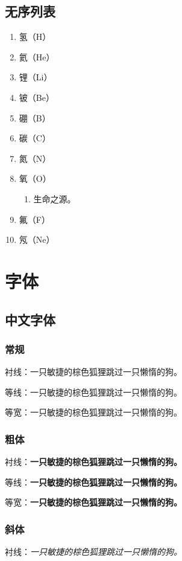 \subsection{无序列表}
\begin{enumerate}
    \item 氢（H）
    \item 氦（He）
    \item 锂（Li）
    \item 铍（Be）
    \item 硼（B）
    \item 碳（C）
    \item 氮（N）
    \item 氧（O）
    \begin{enumerate}
        \item 生命之源。
    \end{enumerate}
    \item 氟（F）
    \item 氖（Ne）
\end{enumerate}

\section{字体}

\subsection{中文字体}

\subsubsection{常规}
衬线：{\rmfamily 一只敏捷的棕色狐狸跳过一只懒惰的狗。}

等线：{\sffamily 一只敏捷的棕色狐狸跳过一只懒惰的狗。}

等宽：{\ttfamily 一只敏捷的棕色狐狸跳过一只懒惰的狗。}

\subsubsection{粗体}
衬线：{\rmfamily\bfseries 一只敏捷的棕色狐狸跳过一只懒惰的狗。}

等线：{\sffamily\bfseries 一只敏捷的棕色狐狸跳过一只懒惰的狗。}

等宽：{\ttfamily\bfseries 一只敏捷的棕色狐狸跳过一只懒惰的狗。}

\subsubsection{斜体}
衬线：{\rmfamily\itshape 一只敏捷的棕色狐狸跳过一只懒惰的狗。}

